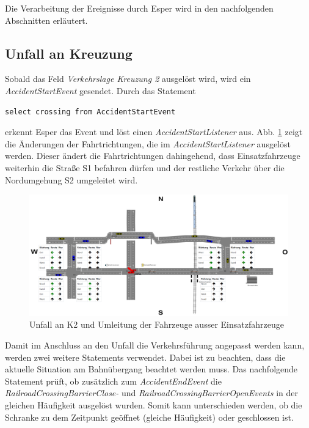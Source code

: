 Die Verarbeitung der Ereignisse durch Esper wird in den nachfolgenden Abschnitten erläutert.
\subsection{Unfall an Kreuzung} \label{accident}

Sobald das Feld \textit{Verkehrslage Kreuzung 2} ausgelöst wird, wird ein \textit{AccidentStartEvent} gesendet. Durch das Statement 

\begin{lstlisting}
select crossing from AccidentStartEvent
\end{lstlisting}

erkennt Esper das Event und löst einen \textit{AccidentStartListener} aus. Abb. \ref{fig6} zeigt die Änderungen der Fahrtrichtungen, die im \textit{AccidentStartListener} ausgelöst werden.  
Dieser ändert die Fahrtrichtungen dahingehend, dass Einsatzfahrzeuge weiterhin die Straße S1 befahren dürfen und der restliche Verkehr über die Nordumgehung S2 umgeleitet wird. 

\begin{figure}[ht]
	\includegraphics[width=\textwidth]{images/Accident.png}
	\caption{Unfall an K2 und Umleitung der Fahrzeuge ausser Einsatzfahrzeuge}
	\label{fig6}
\end{figure}

Damit im Anschluss an den Unfall die Verkehrsführung angepasst werden kann, werden zwei weitere Statements verwendet. Dabei ist zu beachten, dass die aktuelle Situation am Bahnübergang beachtet werden muss. Das nachfolgende Statement prüft, ob zusätzlich zum \textit{AccidentEndEvent} die \textit{RailroadCrossingBarrierClose-} und \textit{RailroadCrossingBarrierOpenEvents} in der gleichen Häufigkeit ausgelöst wurden. Somit kann unterschieden werden, ob die Schranke zu dem Zeitpunkt geöffnet (gleiche Häufigkeit) oder geschlossen ist. 

